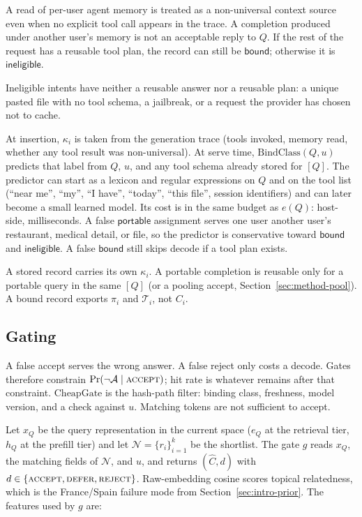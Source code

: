 A read of per-user agent memory is treated as a non-universal context source even when no explicit tool call appears in the trace. A completion produced under another user's memory is not an acceptable reply to $Q$. If the rest of the request has a reusable tool plan, the record can still be $\mathsf{bound}$; otherwise it is $\mathsf{ineligible}$.

Ineligible intents have neither a reusable answer nor a reusable plan: a unique pasted file with no tool schema, a jailbreak, or a request the provider has chosen not to cache.

At insertion, $\kappa_i$ is taken from the generation trace (tools invoked, memory read, whether any tool result was non-universal). At serve time, $\mathrm{BindClass}(Q,u)$ predicts that label from $Q$, $u$, and any tool schema already stored for $[Q]$. The predictor can start as a lexicon and regular expressions on $Q$ and on the tool list (``near me'', ``my'', ``I have'', ``today'', ``this file'', session identifiers) and can later become a small learned model. Its cost is in the same budget as $e(Q)$: host-side, milliseconds. A false $\mathsf{portable}$ assignment serves one user another user's restaurant, medical detail, or file, so the predictor is conservative toward $\mathsf{bound}$ and $\mathsf{ineligible}$. A false $\mathsf{bound}$ still skips decode if a tool plan exists.

A stored record carries its own $\kappa_i$. A portable completion is reusable only for a portable query in the same $[Q]$ (or a pooling accept, Section~\ref{sec:method-pool}). A bound record exports $\pi_i$ and $\mathcal{T}_i$, not $C_i$.

\subsection{Gating}
\label{sec:method-gate}

A false accept serves the wrong answer. A false reject only costs a decode. Gates therefore constrain $\Pr(\neg\mathcal{A}\mid \textsc{accept})$; hit rate is whatever remains after that constraint. $\mathrm{CheapGate}$ is the hash-path filter: binding class, freshness, model version, and a check against $u$. Matching tokens are not sufficient to accept.

Let $x_Q$ be the query representation in the current space ($e_Q$ at the retrieval tier, $h_Q$ at the prefill tier) and let $\mathcal{N}=\{r_i\}_{i=1}^{k}$ be the shortlist. The gate $g$ reads $x_Q$, the matching fields of $\mathcal{N}$, and $u$, and returns $(\hat C, d)$ with $d\in\{\textsc{accept},\textsc{defer},\textsc{reject}\}$. Raw-embedding cosine scores topical relatedness, which is the France/Spain failure mode from Section~\ref{sec:intro-prior}. The features used by $g$ are:

